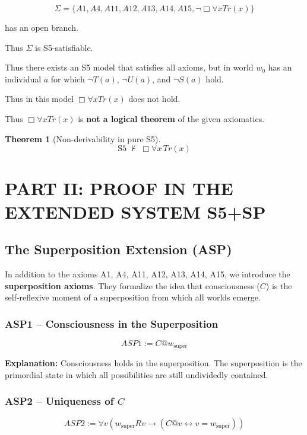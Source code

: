 \documentclass[
]{article}
\newtheorem{theorem}{Theorem}
\begin{document}
\[
\Sigma = \{ A1, A4, A11, A12, A13, A14, A15, \neg\Box\forall xTr(x) \}
\]

has an open branch.

Thus \(\Sigma\) is S5-satisfiable.

Thus there exists an S5 model that satisfies all axioms, but in world \(w_0\) has an individual \(a\) for which \(\neg T(a)\), \(\neg U(a)\), and \(\neg S(a)\) hold.

Thus in this model \(\Box\forall xTr(x)\) does not hold.

Thus \(\Box\forall xTr(x)\) is \textbf{not a logical theorem} of the given axiomatics.

\begin{theorem}[Non-derivability in pure S5]
\[
\boxed{
\text{S5} \;\not\vdash\; \Box\forall x\,Tr(x)
}
\]
\end{theorem}

\section{PART II: PROOF IN THE EXTENDED SYSTEM S5+SP}

\subsection{The Superposition Extension (ASP)}

In addition to the axioms A1, A4, A11, A12, A13, A14, A15, we introduce the \textbf{superposition axioms}. They formalize the idea that consciousness (\(C\)) is the self-reflexive moment of a superposition from which all worlds emerge.

\subsubsection{ASP1 – Consciousness in the Superposition}

\[
\boxed{ASP1 := C @ w_{\text{super}}}
\]

\textbf{Explanation:} Consciousness holds in the superposition. The superposition is the primordial state in which all possibilities are still undividedly contained.

\subsubsection{ASP2 – Uniqueness of \(C\)}

\[
\boxed{ASP2 := \forall v (w_{\text{super}} R v \rightarrow (C @ v \leftrightarrow v = w_{\text{super}}))}
\]
\end{document}
